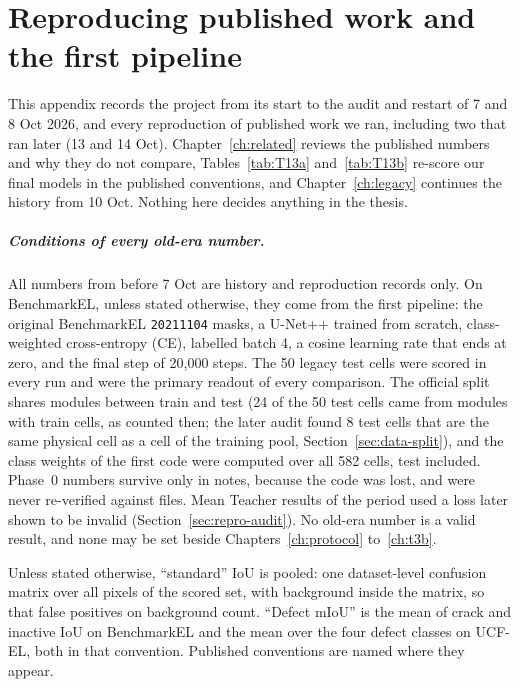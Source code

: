 \chapter{Reproducing published work and the first pipeline}\label{app:repro}

This appendix records the project from its start to the audit and restart of 7 and 8 Oct 2026, and every reproduction of
published work we ran, including two that ran later (13 and 14 Oct). Chapter~\ref{ch:related} reviews the published numbers and why
they do not compare, Tables~\ref{tab:T13a} and~\ref{tab:T13b} re-score our final models in the published conventions, and
Chapter~\ref{ch:legacy} continues the history from 10 Oct. Nothing here decides anything in the thesis.

\paragraph{Conditions of every old-era number.} All numbers from before 7 Oct are history and reproduction records only. On BenchmarkEL, unless
stated otherwise, they come from the first pipeline: the original BenchmarkEL \texttt{20211104} masks, a U-Net++ trained from scratch, class-weighted
cross-entropy (CE), labelled batch 4, a cosine learning rate that ends at zero, and the final step of 20,000 steps. The 50 legacy test
cells were scored in every run and were the primary readout of every comparison. The official split shares modules between train and
test (24 of the 50 test cells came from modules with train cells, as counted then; the later audit found 8 test cells that are the
same physical cell as a cell of the training pool, Section~\ref{sec:data-split}), and the class weights of the first code were
computed over all 582 cells, test included. Phase~0 numbers survive only in notes, because the code was lost, and were never
re-verified against files. Mean Teacher results of the period used a loss later shown to be invalid (Section~\ref{sec:repro-audit}).
No old-era number is a valid result, and none may be set beside Chapters~\ref{ch:protocol} to~\ref{ch:t3b}.

Unless stated otherwise, ``standard'' IoU is pooled: one dataset-level confusion matrix over all pixels of the scored set, with
background inside the matrix, so that false positives on background count. ``Defect mIoU'' is the mean of crack and inactive IoU on
BenchmarkEL and the mean over the four defect classes on UCF-EL, both in that convention. Published conventions are named where they
appear.

